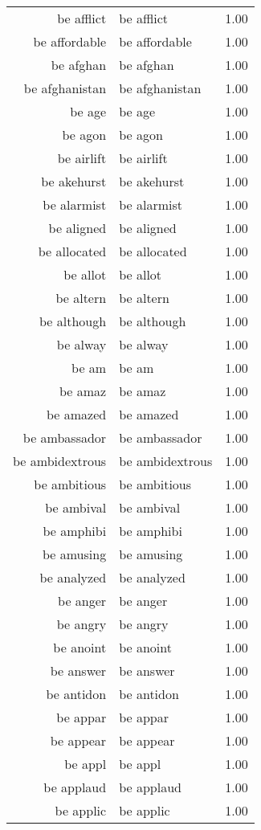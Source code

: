 \begin{table}[ht]
\begin{tabular}{rlr}
  be afflict & be afflict & 1.00 \\ 
  be affordable & be affordable & 1.00 \\ 
  be afghan & be afghan & 1.00 \\ 
  be afghanistan & be afghanistan & 1.00 \\ 
  be age & be age & 1.00 \\ 
  be agon & be agon & 1.00 \\ 
  be airlift & be airlift & 1.00 \\ 
  be akehurst & be akehurst & 1.00 \\ 
  be alarmist & be alarmist & 1.00 \\ 
  be aligned & be aligned & 1.00 \\ 
  be allocated & be allocated & 1.00 \\ 
  be allot & be allot & 1.00 \\ 
  be altern & be altern & 1.00 \\ 
  be although & be although & 1.00 \\ 
  be alway & be alway & 1.00 \\ 
  be am & be am & 1.00 \\ 
  be amaz & be amaz & 1.00 \\ 
  be amazed & be amazed & 1.00 \\ 
  be ambassador & be ambassador & 1.00 \\ 
  be ambidextrous & be ambidextrous & 1.00 \\ 
  be ambitious & be ambitious & 1.00 \\ 
  be ambival & be ambival & 1.00 \\ 
  be amphibi & be amphibi & 1.00 \\ 
  be amusing & be amusing & 1.00 \\ 
  be analyzed & be analyzed & 1.00 \\ 
  be anger & be anger & 1.00 \\ 
  be angry & be angry & 1.00 \\ 
  be anoint & be anoint & 1.00 \\ 
  be answer & be answer & 1.00 \\ 
  be antidon & be antidon & 1.00 \\ 
  be appar & be appar & 1.00 \\ 
  be appear & be appear & 1.00 \\ 
  be appl & be appl & 1.00 \\ 
  be applaud & be applaud & 1.00 \\ 
  be applic & be applic & 1.00 \\ 

\end{tabular}
\end{table}
